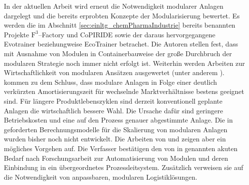 In der aktuellen Arbeit  \cite{Lier_2016a} wird erneut die Notwendigkeit modularer Anlagen dargelegt und die bereits erprobten Konzepte der Modularisierung bewertet. Es werden die im Abschnitt \ref{sec:einltg_chemPharmaIndustrie} bereits benannten Projekte $\text{F}^{3}$--Factory \cite{f3_2014} und CoPIRIDE \cite{copiride_2014} sowie der daraus hervorgegangene \glqq Evotrainer\grqq { } beziehungweise \glqq EcoTrainer\grqq { }\cite{Lang_2012} betrachet. Die Autoren stellen fest, dass mit Ausnahme von Modulen in Containerbauweise der gro\ss{}e Durchbruch der modularen Strategie noch immer nicht erfolgt ist. Weiterhin werden Arbeiten zur Wirtschaftlichkeit von modularen Ans\"atzen ausgewertet (unter anderem \cite{Seifert_2012, Brodhagen_2012}). \citeauthor{Lier_2016a} kommen zu dem Schluss, dass modulare Anlagen in Folge einer deutlich verk\"urzten Amortisierungszeit f\"ur wechselnde Marktverh\"altnisse bestens geeignet sind. F\"ur l\"angere Produktlebenszyklen sind derzeit konventionell geplante Anlagen die wirtschaftlich bessere Wahl. Die Ursache daf\"ur sind geringere Betriebskosten und eine auf den Prozess genauer abgestimmte Anlage. Die in \cite{Bramsiepe_2012} geforderten Berechnungsmodelle f\"ur die Skalierung von modularen Anlagen wurden bisher noch nicht entwickelt. Die Arbeiten von \citeauthor{Brodhagen_2012} \cite{Brodhagen_2012} und \citeauthor{Grundemann_2012} \cite{Grundemann_2012} zeigen aber ein m\"ogliches Vorgehen auf. Die Verfasser best\"atigen den von \citeauthor{Urbas_2012} in \cite{Urbas_2012} genannten akuten Bedarf nach Forschungsarbeit zur Automatisierung von Modulen und deren Einbindung in ein \"ubergeordnetes Prozessleitsystem. Zus\"atzlich verweisen sie auf die Notwendigkeit von anpassbaren, modularen Logistikl\"osungen. 

